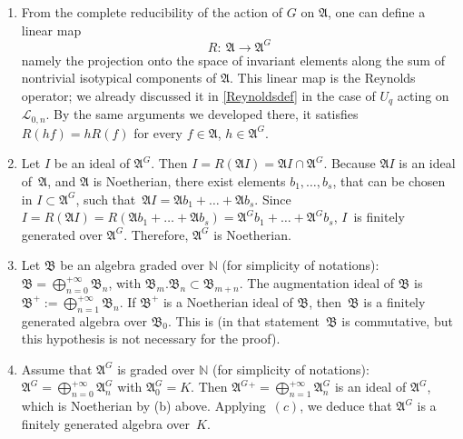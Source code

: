 \documentclass[pdftex]{sigma}
\numberwithin{equation}{section}
\theoremstyle{definition}
\newcommand{\mn}{\mathbb{N}}
\newcommand{\Ll}{{\mathcal L}}
\begin{document}
\begin{enumerate}\itemsep=0pt
\item[(a)] From the complete reducibility of the action of $G$ on $\mathfrak{A}$, one can define a linear map
\[R\colon \ \mathfrak{A}\rightarrow \mathfrak{A}^G\]
namely the projection onto the space of invariant elements along the sum of nontrivial isotypical components of $\mathfrak{A}$. This linear map is the Reynolds operator; we already discussed it in \eqref{Reynoldsdef} in the case of $U_q$ acting on $\Ll_{0,n}$. By the same arguments we developed there, it satisfies $R(hf)=hR(f)$ for every $f\in \mathfrak{A}$, $h\in \mathfrak{A}^G$.

\item[(b)] Let $I$ be an ideal of $\mathfrak{A}^G$. Then $I=R(\mathfrak{A} I)=\mathfrak{A} I\cap \mathfrak{A}^G$. Because $\mathfrak{A}I$ is an ideal of~$\mathfrak{A}$, and $\mathfrak{A}$ is Noetherian, there exist elements $b_1,\dots , b_s$, that can be chosen in $I\subset \mathfrak{A}^G$, such that~${\mathfrak{A}I= \mathfrak{A} b_1+\dots + \mathfrak{A} b_s}$. Since $I=R(\mathfrak{A} I)=R(\mathfrak{A}b_1+\dots + \mathfrak{A}b_s)=\mathfrak{A}^Gb_1+\dots + \mathfrak{A}^G b_s$, $I$~is finitely generated over $\mathfrak{A}^G$. Therefore, $\mathfrak{A}^G$ is Noetherian.

\item[(c)] Let $\mathfrak{B}$ be an algebra graded over $\mn$ (for simplicity of notations): $ \mathfrak{B}=\bigoplus_{n=0}^{+\infty }\mathfrak{B}_n$, with ${\mathfrak{B}_m.\mathfrak{B}_n \subset \mathfrak{B}_{m+n}}$. The augmentation ideal of $\mathfrak{B}$ is $ \mathfrak{B}^+:=\bigoplus_{n=1}^{+\infty }\mathfrak{B}_n$. If $\mathfrak{B}^+$ is a Noetherian ideal of $\mathfrak{B}$, then~$\mathfrak{B}$ is a finitely generated algebra over $\mathfrak{B}_0$. This is \cite[Lemma~2.4.5]{Sp} (in that statement~$\mathfrak{B}$ is commutative, but this hypothesis is not necessary for the proof).

\item[(d)] Assume that $\mathfrak{A}^G$ is graded over $\mn$ (for simplicity of notations): $ \mathfrak{A}^G=\bigoplus_{n=0}^{+\infty }\mathfrak{A}^G_n$ with ${\mathfrak{A}^G_0=K}$. Then $ \mathfrak{A}^G{}^+=\bigoplus_{n=1}^{+\infty }\mathfrak{A}^G_n$ is an ideal of $\mathfrak{A}^G$, which is Noetherian by (b) above. Applying~$(c)$, we deduce that $\mathfrak{A}^G$ is a finitely generated algebra over~$K$.
\end{enumerate}
\end{document}
